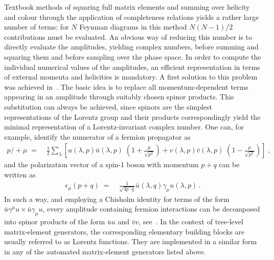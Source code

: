 Textbook methods of squaring full matrix elements and summing over helicity
and colour through the application of completeness relations yields a rather 
large number of terms: for $N$ Feynman diagrams in this method $N(N-1)/2$ contributions
must be evaluated.  An obvious way of reducing this number is to 
directly evaluate the amplitudes, yielding complex numbers, before summing 
and squaring them and before sampling over the phase space.  
In order to compute the individual numerical values of the amplitudes, an 
efficient representation in terms of external momenta and helicities is mandatory.  
A first solution to this problem was achieved in~\cite{Kleiss:1985yh}.  
The basic idea is to replace all momentum-dependent terms appearing
in an amplitude through suitably chosen spinor products. This substitution 
can always be achieved, since spinors are the simplest representations of 
the Lorentz group and their products correspondingly yield the minimal 
representation of a Lorentz-invariant complex number. One can, for example, 
identify the numerator of a fermion propagator as
\begin{equation}
\begin{split}
p\!\!\!/+\mu \;=\; &
\frac12\sum\limits_\lambda
        \left[u(\lambda,p)\bar u(\lambda,p)\;
                               \left(1+\frac{\mu}{\sqrt{p^2}}\right)+
             v(\lambda,p)\bar v(\lambda,p)\;
                              \left(1-\frac{\mu}{\sqrt{p^2}}\right)\right]\;,
\end{split}
\end{equation}
and the polarization vector of a spin-1 boson with momentum $p+q$ can be 
written as
\begin{equation}
\begin{split}
\epsilon_\mu(p+q) \;=\; & \frac{1}{\sqrt{4p\cdot q}}
             \bar u(\lambda,q)\gamma_\mu u(\lambda,p)\,.
\end{split}
\end{equation}
In such a way, and employing a Chisholm identity for terms of the form
$\bar u\gamma^\mu u\times\bar u\gamma_\mu u$, every amplitude containing
fermion interactions can be decomposed into spinor products of the form 
$\bar uu$ and $\bar vv$, see~\cite{Kleiss:1985yh,Ballestrero:1992ed,
  Ballestrero:1992dv,Ballestrero:1994ti}.  
In the context of tree-level matrix-element generators, the corresponding 
elementary building blocks are usually referred to as Lorentz functions.
They are implemented in a similar form in any of the automated 
matrix-element generators listed above.

